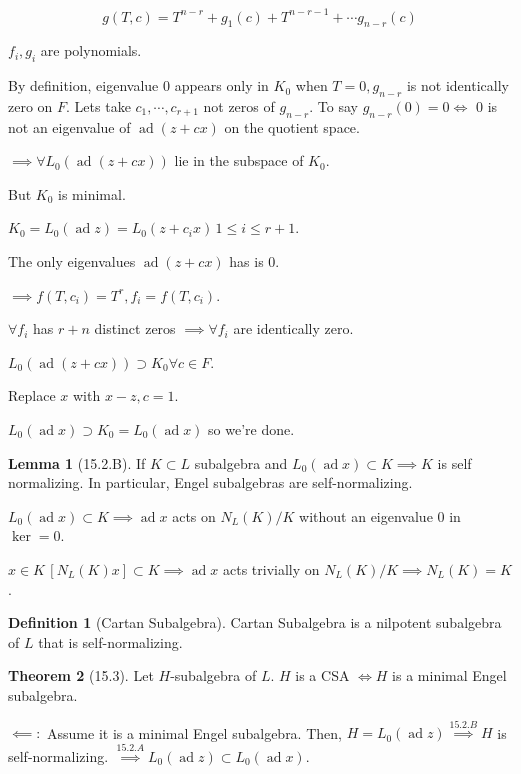 \documentclass{article}
\theoremstyle{definition}
\newtheorem*{definition}{Definition}
\newtheorem{theorem}{Theorem}[section]
\newtheorem{lemma}[theorem]{Lemma}
\begin{document}
\[
    g(T,c) = T^{n-r} + g_1(c) + T^{n-r-1} + \cdots g_{n-r}(c)
\]

\(f_i, g_i\) are polynomials.

By definition, eigenvalue \(0\) appears only in \(K_0\) when \(T=0, g_{n-r}\) is not identically zero on \(F\). Lets take \(c_1, \cdots , c_{r+1}\) not zeros of \(g_{n-r}\). To say \(g_{n-r}(0) = 0 \iff\) \(0\) is not an eigenvalue of \(\operatorname{ad} (z+cx)\) on the quotient space.

\(\implies \forall L_0(\operatorname{ad} (z+cx))\) lie in the subspace of \(K_0\).

But \(K_0\) is minimal.

\(K_0 = L_0(\operatorname{ad} z) = L_0(z+c_ix)\, 1 \leq i \leq r+1\).

The only eigenvalues \(\operatorname{ad}(z+cx)\) has is \(0\).

\(\implies f(T,c_i) = T^r, f_i = f(T,c_i)\).

\(\forall f_i\) has \(r+n\) distinct zeros \(\implies \forall f_i\) are identically zero.

\(L_0(\operatorname{ad} (z+cx)) \supset K_0 \forall c \in F\).

Replace \(x\) with \(x-z, c=1\).

\(L_0(\operatorname{ad} x)  \supset K_0 = L_0(\operatorname{ad} x)\) so we're done.

\begin{lemma}
    [15.2.B] If \(K \subset L\) subalgebra and \(L_0(\operatorname{ad} x) \subset K \implies K\) is self normalizing. In particular, Engel subalgebras are self-normalizing.  
\end{lemma}

\(L_0(\operatorname{ad} x) \subset K \implies \operatorname{ad} x\) acts on \(N_L(K) / K\) without an eigenvalue \(0\) in \(\ker = 0\).

\(x\in K \, [N_L(K)x] \subset K \implies \operatorname{ad} x\) acts trivially on \(N_L(K) / K \implies N_L(K) = K\).

\begin{definition}
    [Cartan Subalgebra] Cartan Subalgebra is a nilpotent subalgebra of \(L\) that is self-normalizing.
\end{definition}

\begin{theorem}
    [15.3] Let \(H\)-subalgebra of \(L\). \(H\) is a CSA \(\iff H\) is a minimal Engel subalgebra.
\end{theorem}

\(\impliedby:\) Assume it is a minimal Engel subalgebra. Then, \(H = L_0(\operatorname{ad} z) \overset{15.2.B}{\implies} H\) is self-normalizing. \(\overset{15.2.A}{\implies} L_0(\operatorname{ad} z) \subset L_0(\operatorname{ad} x)\).
\end{document}

